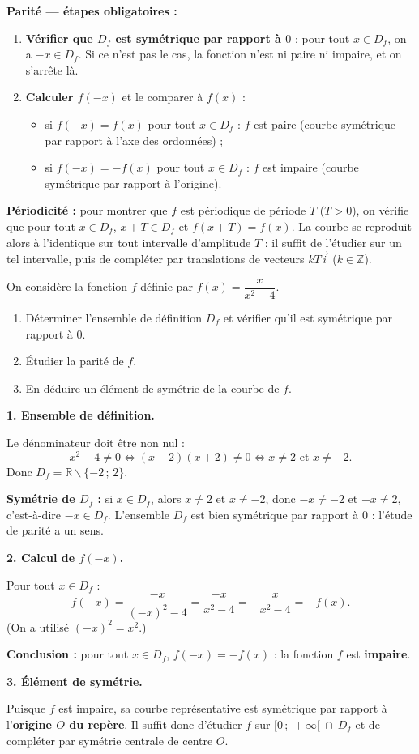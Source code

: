 \documentclass[11pt]{article}
\newcommand{\cle}[1]{{\popxbold\color{popdark}#1}}
\def\setminus{\mathbin{\backslash}}\let\smallsetminus\setminus
\begin{document}
\begin{methode}
\textbf{Parité — étapes obligatoires :}
\begin{enumerate}
\item \textbf{Vérifier que $D_f$ est symétrique par rapport à $0$} : pour tout $x\in D_f$, on a $-x\in D_f$. Si ce n'est pas le cas, la fonction n'est ni paire ni impaire, et on s'arrête là.
\item \textbf{Calculer $f(-x)$} et le comparer à $f(x)$ :
\begin{itemize}
\item si $f(-x)=f(x)$ pour tout $x\in D_f$ : $f$ est \cle{paire} (courbe symétrique par rapport à l'axe des ordonnées) ;
\item si $f(-x)=-f(x)$ pour tout $x\in D_f$ : $f$ est \cle{impaire} (courbe symétrique par rapport à l'origine).
\end{itemize}
\end{enumerate}
\textbf{Périodicité :} pour montrer que $f$ est périodique de période $T$ ($T>0$), on vérifie que pour tout $x\in D_f$, $x+T\in D_f$ et $f(x+T)=f(x)$. La courbe se reproduit alors à l'identique sur tout intervalle d'amplitude $T$ : il suffit de l'étudier sur un tel intervalle, puis de compléter par translations de vecteurs $kT\vec{i}$ ($k\in\mathbb{Z}$).
\end{methode}

\begin{exoresolu}
On considère la fonction $f$ définie par $f(x)=\dfrac{x}{x^2-4}$.
\begin{enumerate}
\item Déterminer l'ensemble de définition $D_f$ et vérifier qu'il est symétrique par rapport à $0$.
\item Étudier la parité de $f$.
\item En déduire un élément de symétrie de la courbe de $f$.
\end{enumerate}
\tcblower
\textbf{1. Ensemble de définition.}

Le dénominateur doit être non nul :
\[x^2-4\neq 0 \iff (x-2)(x+2)\neq 0 \iff x\neq 2 \text{ et } x\neq -2.\]
Donc $D_f=\mathbb{R}\setminus\{-2\,;\,2\}$.

\textbf{Symétrie de $D_f$ :} si $x\in D_f$, alors $x\neq 2$ et $x\neq -2$, donc $-x\neq -2$ et $-x\neq 2$, c'est-à-dire $-x\in D_f$. L'ensemble $D_f$ est bien symétrique par rapport à $0$ : l'étude de parité a un sens.

\textbf{2. Calcul de $f(-x)$.}

Pour tout $x\in D_f$ :
\[f(-x)=\dfrac{-x}{(-x)^2-4}=\dfrac{-x}{x^2-4}=-\dfrac{x}{x^2-4}=-f(x).\]
(On a utilisé $(-x)^2=x^2$.)

\textbf{Conclusion :} pour tout $x\in D_f$, $f(-x)=-f(x)$ : la fonction $f$ est \textbf{impaire}.

\textbf{3. Élément de symétrie.}

Puisque $f$ est impaire, sa courbe représentative est symétrique par rapport à l'\textbf{origine $O$ du repère}. Il suffit donc d'étudier $f$ sur $[0\,;\,+\infty[\ \cap\ D_f$ et de compléter par symétrie centrale de centre $O$.
\end{exoresolu}
\end{document}
